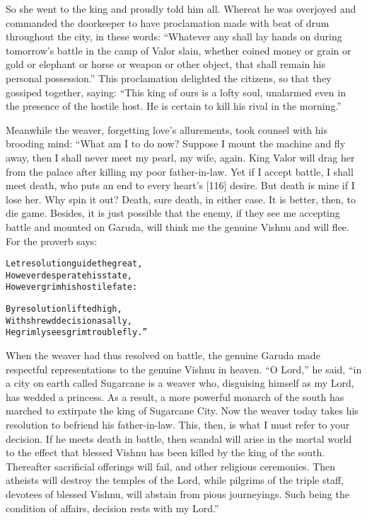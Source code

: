 \documentclass{article}
\renewenvironment{verbatim}{\begin{alltt}\normalfont\begin{centering}}{\end{centering}\end{alltt}}
\begin{document}
So she went to the king and proudly told him all. Whereat he was
overjoyed and commanded the doorkeeper to have proclamation made
with beat of drum throughout the city, in these words:
``Whatever any shall lay hands on during tomorrow's battle in the camp of Valor slain, whether coined money or grain or gold or elephant or horse or weapon or other object, that shall remain his personal possession.''
This proclamation delighted the citizens, so that they gossiped
together, saying:
``This king of ours is a lofty soul, unalarmed even in the presence of the hostile host. He is certain to kill his rival in the morning.''

Meanwhile the weaver, forgetting love's allurements, took counsel
with his brooding mind: “What am I to do now? Suppose I mount the
machine and fly away, then I shall never meet my pearl, my wife,
again. King Valor will drag her from the palace after killing my
poor father-in-law. Yet if I accept battle, I shall meet death, who
puts an end to every heart's [116] desire. But death is mine if I
lose her. Why spin it out? Death, sure death, in either case. It is
better, then, to die game. Besides, it is just possible that the
enemy, if they see me accepting battle and mounted on Garuda, will
think me the genuine Vishnu and will flee. For the proverb says:

\begin{verbatim}
Let resolution guide the great,
However desperate his state,
However grim his hostile fate:

By resolution lifted high,
With shrewd decision as ally,
He grimly sees grim trouble fly.”
\end{verbatim}
When the weaver had thus resolved on battle, the genuine Garuda
made respectful representations to the genuine Vishnu in heaven.
``O Lord,'' he said,
``in a city on earth called Sugarcane is a weaver who, disguising himself as my Lord, has wedded a princess. As a result, a more powerful monarch of the south has marched to extirpate the king of Sugarcane City. Now the weaver today takes his resolution to befriend his father-in-law. This, then, is what I must refer to your decision. If he meets death in battle, then scandal will arise in the mortal world to the effect that blessed Vishnu has been killed by the king of the south. Thereafter sacrificial offerings will fail, and other religious ceremonies. Then atheists will destroy the temples of the Lord, while pilgrims of the triple staff, devotees of blessed Vishnu, will abstain from pious journeyings. Such being the condition of affairs, decision rests with my Lord.''
\end{document}
